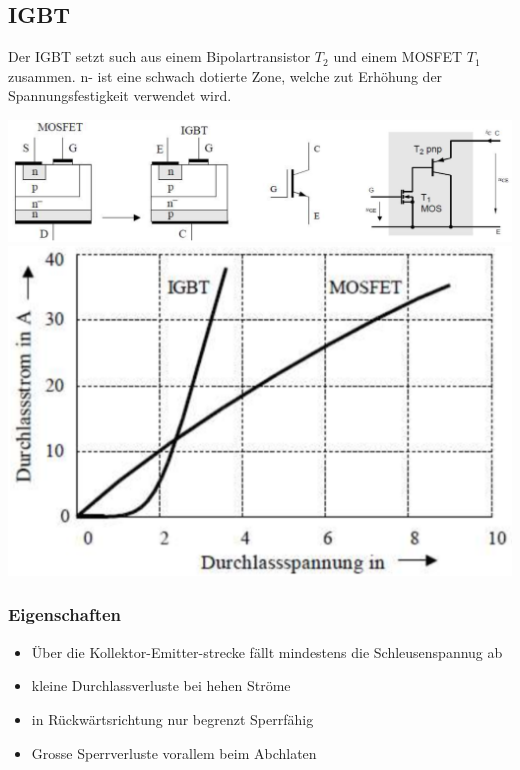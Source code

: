 \subsection{IGBT}
Der IGBT setzt such aus einem Bipolartransistor $ T_2 $ und einem MOSFET $ T_1 $ zusammen.\newline
    n- ist eine schwach dotierte Zone, welche zut Erhöhung der Spannungsfestigkeit verwendet wird.
\begin{center}
  \includegraphics[width=0.7\linewidth]{images/IGBTaufbau}
  \includegraphics[width=0.25\linewidth]{images/IGBTkennlinie}
\end{center}
\vspace{-0.5cm}
\subsubsection{Eigenschaften}
\begin{multicols}{2}
    \begin{itemize}
        \item Über die Kollektor-Emitter-strecke fällt mindestens die Schleusenspannug ab
        \item kleine Durchlassverluste bei hehen Ströme
        \item in Rückwärtsrichtung nur begrenzt Sperrfähig
        \item Grosse Sperrverluste vorallem beim Abchlaten
    \end{itemize}
\end{multicols}
\clearpage

